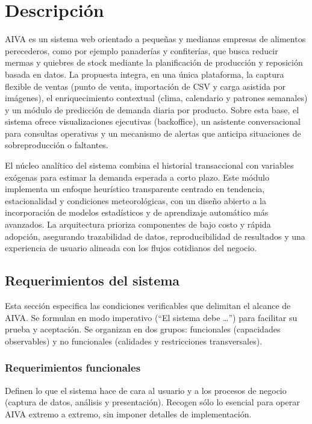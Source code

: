 \chapter{Descripción}\label{chapter03}

AIVA es un sistema web orientado a pequeñas y medianas empresas de alimentos perecederos, como por ejemplo panaderías y confiterías, que busca reducir mermas y quiebres de stock mediante la planificación de producción y reposición basada en datos. La propuesta integra, en una única plataforma, la captura flexible de ventas (punto de venta, importación de CSV y carga asistida por imágenes), el enriquecimiento contextual (clima, calendario y patrones semanales) y un módulo de predicción de demanda diaria por producto. Sobre esta base, el sistema ofrece visualizaciones ejecutivas (backoffice), un asistente conversacional para consultas operativas y un mecanismo de alertas que anticipa situaciones de sobreproducción o faltantes. 

El núcleo analítico del sistema combina el historial transaccional con variables exógenas para estimar la demanda esperada a corto plazo. Este módulo implementa un enfoque heurístico transparente centrado en tendencia, estacionalidad y condiciones meteorológicas, con un diseño abierto a la incorporación de modelos estadísticos y de aprendizaje automático más avanzados. La arquitectura prioriza componentes de bajo costo y rápida adopción, asegurando trazabilidad de datos, reproducibilidad de resultados y una experiencia de usuario alineada con los flujos cotidianos del negocio.


\vspace{1cm}
\section{Requerimientos del sistema}
Esta sección especifica las condiciones verificables que delimitan el alcance de AIVA. Se formulan en modo imperativo (“El sistema debe …”) para facilitar su prueba y aceptación. Se organizan en dos grupos: funcionales (capacidades observables) y no funcionales (calidades y restricciones transversales).

\subsection{Requerimientos funcionales}
Definen lo que el sistema hace de cara al usuario y a los procesos de negocio (captura de datos, análisis y presentación). Recogen sólo lo esencial para operar AIVA extremo a extremo, sin imponer detalles de implementación.

